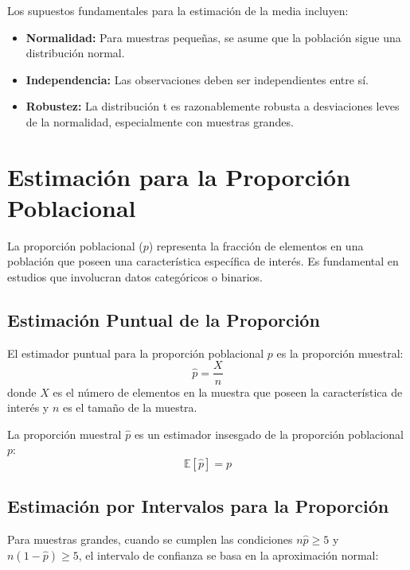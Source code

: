 \begin{remark}
Los supuestos fundamentales para la estimación de la media incluyen:
\begin{itemize}
\item \textbf{Normalidad:} Para muestras pequeñas, se asume que la población sigue una distribución normal.
\item \textbf{Independencia:} Las observaciones deben ser independientes entre sí.
\item \textbf{Robustez:} La distribución t es razonablemente robusta a desviaciones leves de la normalidad, especialmente con muestras grandes.
\end{itemize}
\end{remark}

\section{Estimación para la Proporción Poblacional}

La proporción poblacional ($p$) representa la fracción de elementos en una población que poseen una característica específica de interés. Es fundamental en estudios que involucran datos categóricos o binarios.

\subsection{Estimación Puntual de la Proporción}

\begin{definition}
El estimador puntual para la proporción poblacional $p$ es la proporción muestral:
\[
\hat{p} = \frac{X}{n}
\]
donde $X$ es el número de elementos en la muestra que poseen la característica de interés y $n$ es el tamaño de la muestra.
\end{definition}

\begin{theorem}
La proporción muestral $\hat{p}$ es un estimador insesgado de la proporción poblacional $p$:
\[
\mathbb{E}[\hat{p}] = p
\]
\end{theorem}

\subsection{Estimación por Intervalos para la Proporción}

Para muestras grandes, cuando se cumplen las condiciones $n\hat{p} \geq 5$ y $n(1-\hat{p}) \geq 5$, el intervalo de confianza se basa en la aproximación normal:


